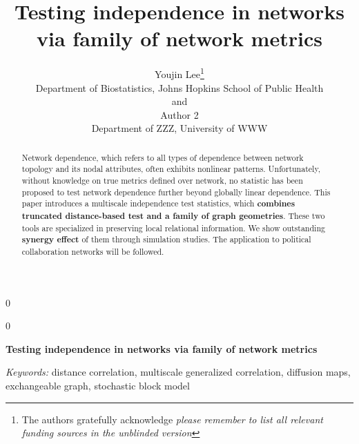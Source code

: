 \documentclass[12pt]{article}
\newcommand{\blind}{0}
\theoremstyle{definition}
\begin{document}
	
	
	\def\spacingset#1{\renewcommand{\baselinestretch}%
		{#1}\small\normalsize} \spacingset{1}
	
	
	
	\blind
	{
		\title{\bf Testing independence in networks via family of network metrics}
		\author{Youjin Lee\thanks{
				The authors gratefully acknowledge \textit{please remember to list all relevant funding sources in the unblinded version}}\hspace{.2cm}\\
			Department of Biostatistics, Johns Hopkins School of Public Health\\
			and \\
			Author 2 \\
			Department of ZZZ, University of WWW}
		\maketitle
	} \fi
	
	\blind
	{
		\bigskip
		\bigskip
		\bigskip
		\begin{center}
			{\LARGE\bf Testing independence in networks via family of network metrics}
		\end{center}
		\medskip
	} \fi
	
	
\sloppy
\bigskip
\begin{abstract}
		Network dependence, which refers to all types of dependence between network topology and its nodal attributes, often exhibits nonlinear patterns. Unfortunately, without knowledge on true metrics defined over network, no statistic has been proposed to test network dependence further beyond globally linear dependence. This paper introduces a multiscale independence test statistics, which \textbf{combines truncated distance-based test and a family of graph geometries}. These two tools are specialized in preserving local relational information. We show outstanding \textbf{synergy effect} of them through simulation studies. The application to political collaboration networks will be followed. 
\end{abstract}
	
	\noindent%
	{\it Keywords:} distance correlation, multiscale generalized correlation, diffusion maps, exchangeable graph, stochastic block model 
	\vfill
	
	\newpage
	\spacingset{1.45} %
\end{document}
